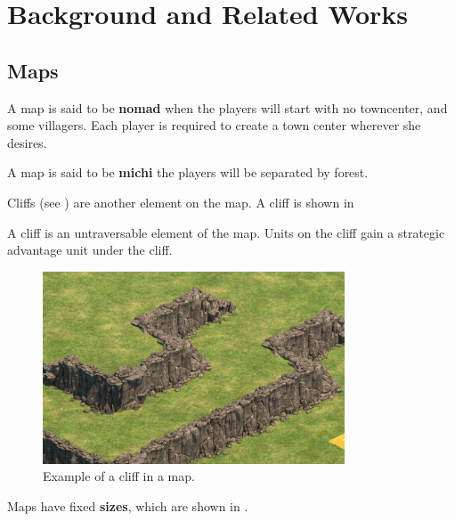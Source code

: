 \chapter{Background and Related Works}


\section{Maps}

\begin{definition}
    A map is said to be \textbf{nomad} when the players will start with no towncenter, and some villagers. Each player is required to create a town center wherever she desires.
\end{definition}

\begin{definition}
    A map is said to be \textbf{michi} the players will be separated by forest.
\end{definition}

Cliffs (see ) are another element on the map. A cliff is shown in 

\begin{definition}\label{def:cliff}
    A cliff is an untraversable element of the map. Units on the cliff gain a strategic advantage \wrt{} unit under the cliff.
\end{definition}

\begin{figure}[ht]
    \centering
    \includegraphics[width=0.8\textwidth]{src/images/cliffs}
    \caption{Example of a cliff in a map.}
    \label{fig:cliff}
\end{figure}

Maps have fixed \textbf{sizes}, which are shown in \cite{zetnus:2015}.

